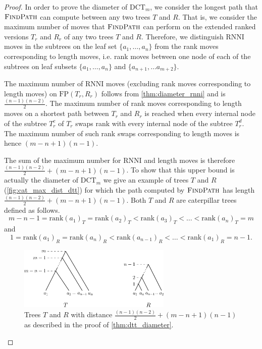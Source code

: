 \documentclass[11pt]{amsart}
\newcommand{\rnni}{\mathrm{RNNI}}
\newcommand{\findpath}{\textsc{FindPath}}
\newcommand{\rank}{\mathrm{rank}}
\newcommand{\fp}{\mathrm{FP}}
\newcommand{\dtt}{\mathrm{DCT}}
\begin{document}
\begin{proof}
	In order to prove the diameter of $\dtt_m$, we consider the longest path that $\findpath$ can compute between any two trees $T$ and $R$.
	That is, we consider the maximum number of moves that $\findpath$ can perform on the extended ranked versions $T_r$ and $R_r$ of any two trees $T$ and $R$.
	Therefore, we distinguish $\rnni$ moves in the subtrees on the leaf set $\{a_1, \ldots, a_n\}$ from the rank moves corresponding to length moves, i.e. rank moves between one node of each of the subtrees on leaf subsets $\{a_1, \ldots, a_n\}$ and $\{a_{n+1}, \ldots a_{m+2}\}$.

	The maximum number of $\rnni$ moves (excluding rank moves corresponding to length moves) on $\fp(T_r,R_r)$ follows from \autoref{thm:diameter_rnni} and is $\frac{(n-1)(n-2)}{2}$.
	The maximum number of rank moves corresponding to length moves on a shortest path between $T_r$ and $R_r$ is reached when every internal node of the subtree $T_r^c$ of $T_r$ swaps rank with every internal node of the subtree $T_r^d$.
	The maximum number of such rank swaps corresponding to length moves is hence $(m-n+1)(n-1)$.

	The sum of the maximum number for $\rnni$ and length moves is therefore $\frac{(n-1)(n-2)}{2} + (m-n+1)(n-1)$.
	To show that this upper bound is actually the diameter of $\dtt_m$ we give an example of trees $T$ and $R$ (\autoref{fig:cat_max_dist_dtt}) for which the path computed by $\findpath$ has length $\frac{(n-1)(n-2)}{2} + (m-n+1)(n-1)$.
	Both $T$ and $R$ are caterpillar trees defined as follows.
	\[m-n-1 = \rank(a_1)_T = \rank(a_2)_T < \rank(a_3)_T < \ldots < \rank(a_n)_T = m\]
	and
	\[1 = \rank(a_1)_R = \rank(a_n)_R < \rank(a_{n-1})_R < \ldots < \rank(a_1)_R = n-1.\]
	\begin{figure}[ht]
		\includegraphics[width=0.65\textwidth]{cat_max_dist_dtt.eps}
		\caption{Trees $T$ and $R$ with distance $\frac{(n-1)(n-2)}{2} + (m-n+1)(n-1)$ as described in the proof of \autoref{thm:dtt_diameter}.}
		\label{fig:cat_max_dist_dtt}
	\end{figure}
\end{proof}
\end{document}
